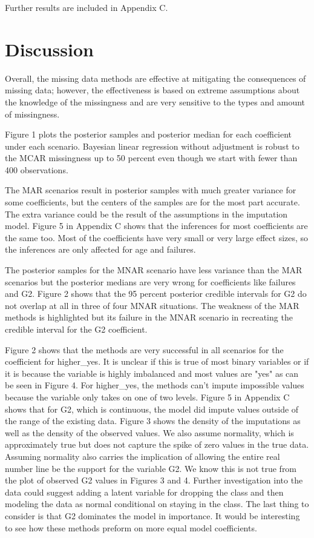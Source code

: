 \documentclass[11pt]{article}
\begin{document}
Further results are included in Appendix C. 

\section{Discussion}

Overall, the missing data methods are effective at mitigating the consequences of missing data; however, the effectiveness is based on extreme assumptions about the knowledge of the missingness and are very sensitive to the types and amount of missingness. 

Figure 1 plots the posterior samples and posterior median for each coefficient under each scenario. Bayesian linear regression without adjustment is robust to the MCAR missingness up to 50 percent even though we start with fewer than 400 observations. 

The MAR scenarios result in posterior samples with much greater variance for some coefficients, but the centers of the samples are for the most part accurate. The extra variance could be the result of the assumptions in the imputation model. Figure 5 in Appendix C shows that the inferences for most coefficients are the same too. Most of the coefficients have very small or very large effect sizes, so the inferences are only affected for age and failures.

The posterior samples for the MNAR scenario have less variance than the MAR scenarios but the posterior medians are very wrong for coefficients like failures and G2. Figure 2 shows that the 95 percent posterior credible intervals for G2 do not overlap at all in three of four MNAR situations. The weakness of the MAR methods is highlighted but its failure in the MNAR scenario in recreating the credible interval for the G2 coefficient.  

Figure 2 shows that the methods are very successful in all scenarios for the coefficient for higher\_yes. It is unclear if this is true of most binary variables or if it is because the variable is highly imbalanced and most values are "yes" as can be seen in Figure 4. For higher\_yes, the methods can't impute impossible values because the variable only takes on one of two levels. Figure 5 in Appendix C shows that for G2, which is continuous, the model did impute values outside of the range of the existing data. Figure 3 shows the density of the imputations as well as the density of the observed values. We also assume normality, which is approximately true but does not capture the spike of zero values in the true data. Assuming normality also carries the implication of allowing the entire real number line be the support for the variable G2. We know this is not true from the plot of observed G2 values in Figures 3 and 4. Further investigation into the data could suggest adding a latent variable for dropping the class and then modeling the data as normal conditional on staying in the class. The last thing to consider is that G2 dominates the model in importance. It would be interesting to see how these methods preform on more equal model coefficients.
\end{document}
